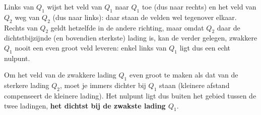 \documentclass{ximera}
\begin{document}
\begin{question}
\begin{solution}
        Links van $Q_1$ wijst het veld van $Q_1$ naar $Q_1$ toe (dus naar rechts) en het veld van $Q_2$ weg van $Q_2$ (dus naar links): daar staan de velden wel tegenover elkaar. Rechts van $Q_2$ geldt hetzelfde in de andere richting, maar omdat $Q_2$ daar de dichtstbijzijnde (en bovendien sterkste) lading is, kan de verder gelegen, zwakkere $Q_1$ nooit een even groot veld leveren: enkel links van $Q_1$ ligt dus een echt nulpunt.

        Om het veld van de zwakkere lading $Q_1$ even groot te maken als dat van de sterkere lading $Q_2$, moet je immers dichter bij $Q_1$ staan (kleinere afstand compenseert de kleinere lading). Het nulpunt ligt dus buiten het gebied tussen de twee ladingen, \textbf{het dichtst bij de zwakste lading $Q_1$}.
    \end{solution}
\end{question}
\end{document}

